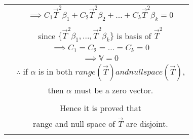 \documentclass[journal,12pt,twocolumn]{IEEEtran}
\begin{document}
\begin{table}[h!]
\begin{center}
\begin{tabular}{|c|c|}
& $ \implies C_1\vec{T}^2\beta_1+C_2\vec{T}^2\beta_2+\ldots+C_k\vec{T}^2\beta_k = 0$\\
& \\
& since $\lbrace \vec{T}^2\beta_1,\ldots,\vec{T}^2\beta_k \rbrace$ is basis of $\vec{T}^2$\\
& $\implies C_1 = C_2 = \ldots = C_k = 0$\\
& $\implies \mathbb{V} = 0$\\
& $\therefore$ if $\alpha$  is in both $ range(\vec{T}) and null space(\vec{T})$, \\
& then $\alpha$ must be a zero vector.\\
& \\
& Hence it is proved that \\
& range and null space of $\vec{T}$ are disjoint.\\
& \\
\hline
\end{tabular}
\end{center}
\end{table}
\end{document}
